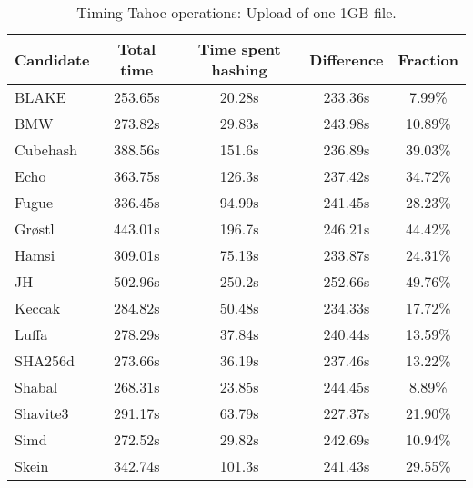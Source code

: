 \begin{table}[h]
  \centering
  \caption{Timing Tahoe operations: Upload of one 1GB file.}
  \begin{tabular}{ | l | c | c | c | c | }
    \hline
    Candidate & Total time & Time spent hashing & Difference & Fraction \\ \hline
    BLAKE     &  253.65s  &  20.28s  &  233.36s  &  7.99\%   \\  \hline
    BMW       &  273.82s  &  29.83s  &  243.98s  &  10.89\%  \\  \hline
    Cubehash  &  388.56s  &  151.6s  &  236.89s  &  39.03\%  \\  \hline
    Echo      &  363.75s  &  126.3s  &  237.42s  &  34.72\%  \\  \hline
    Fugue     &  336.45s  &  94.99s  &  241.45s  &  28.23\%  \\  \hline
    Grøstl    &  443.01s  &  196.7s  &  246.21s  &  44.42\%  \\  \hline
    Hamsi     &  309.01s  &  75.13s  &  233.87s  &  24.31\%  \\  \hline
    JH        &  502.96s  &  250.2s  &  252.66s  &  49.76\%  \\  \hline
    Keccak    &  284.82s  &  50.48s  &  234.33s  &  17.72\%  \\  \hline
    Luffa     &  278.29s  &  37.84s  &  240.44s  &  13.59\%  \\  \hline
    SHA256d   &  273.66s  &  36.19s  &  237.46s  &  13.22\%  \\  \hline
    Shabal    &  268.31s  &  23.85s  &  244.45s  &  8.89\%   \\  \hline
    Shavite3  &  291.17s  &  63.79s  &  227.37s  &  21.90\%  \\  \hline
    Simd      &  272.52s  &  29.82s  &  242.69s  &  10.94\%  \\  \hline
    Skein     &  342.74s  &  101.3s  &  241.43s  &  29.55\%  \\  \hline
  \end{tabular}
  \label{tbl:hashingtimes:put1gb}
\end{table}

